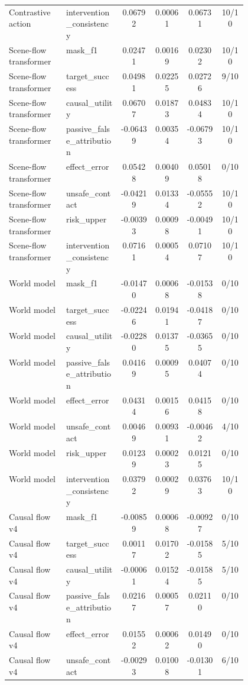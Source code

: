 \documentclass{article}
\begin{document}
\begin{center}
\begin{longtable}{p{0.24\linewidth}p{0.23\linewidth}cccc}
Contrastive action & intervention\_consistency & 0.06792 & 0.00061 & 0.06731 & 10/10\\
Scene-flow transformer & mask\_f1 & 0.02471 & 0.00169 & 0.02302 & 10/10\\
Scene-flow transformer & target\_success & 0.04981 & 0.02255 & 0.02726 & 9/10\\
Scene-flow transformer & causal\_utility & 0.06707 & 0.01873 & 0.04834 & 10/10\\
Scene-flow transformer & passive\_false\_attribution & -0.06439 & 0.00354 & -0.06793 & 10/10\\
Scene-flow transformer & effect\_error & 0.05428 & 0.00409 & 0.05018 & 0/10\\
Scene-flow transformer & unsafe\_contact & -0.04219 & 0.01334 & -0.05552 & 10/10\\
Scene-flow transformer & risk\_upper & -0.00393 & 0.00098 & -0.00491 & 10/10\\
Scene-flow transformer & intervention\_consistency & 0.07161 & 0.00054 & 0.07107 & 10/10\\
World model & mask\_f1 & -0.01470 & 0.00068 & -0.01538 & 0/10\\
World model & target\_success & -0.02246 & 0.01941 & -0.04187 & 0/10\\
World model & causal\_utility & -0.02280 & 0.01375 & -0.03655 & 0/10\\
World model & passive\_false\_attribution & 0.04169 & 0.00095 & 0.04074 & 0/10\\
World model & effect\_error & 0.04314 & 0.00156 & 0.04158 & 0/10\\
World model & unsafe\_contact & 0.00469 & 0.00931 & -0.00462 & 4/10\\
World model & risk\_upper & 0.01239 & 0.00023 & 0.01215 & 0/10\\
World model & intervention\_consistency & 0.03792 & 0.00029 & 0.03763 & 10/10\\
Causal flow v4 & mask\_f1 & -0.00859 & 0.00068 & -0.00927 & 0/10\\
Causal flow v4 & target\_success & 0.00117 & 0.01702 & -0.01585 & 5/10\\
Causal flow v4 & causal\_utility & -0.00061 & 0.01524 & -0.01585 & 5/10\\
Causal flow v4 & passive\_false\_attribution & 0.02167 & 0.00057 & 0.02110 & 0/10\\
Causal flow v4 & effect\_error & 0.01552 & 0.00062 & 0.01490 & 0/10\\
Causal flow v4 & unsafe\_contact & -0.00293 & 0.01008 & -0.01301 & 6/10\\

\end{longtable}
\end{center}
\end{document}
